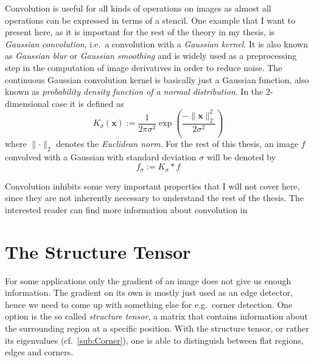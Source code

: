 Convolution is useful for all kinds of operations on images as almost all operations can be
expressed in terms of a stencil.\cite{ipcv}
One example that I want to present here, as it is important for the rest of the theory in my
thesis, is \textit{Gaussian convolution}, i.e.\ a convolution with a
\textit{Gaussian kernel}. It is also known as \textit{Gaussian blur} or \textit{Gaussian
smoothing} and is widely used as a preprocessing step in the computation of image derivatives in
order to reduce noise.
The continuous Gaussian convolution kernel is basically just a Gaussian function, also known as
\textit{probability density function of a normal distribution}. In the 2-dimensional case it is defined as
\begin{equation}
    K_\sigma (\boldsymbol x) := \frac{1}{2\pi\sigma^2}\exp\left(\frac{-\lVert\boldsymbol
            x\rVert_2^2}{2\sigma^2}\right)
\end{equation}
where $\lVert \cdot \rVert_2$ denotes the \textit{Euclidean norm}.
For the rest of this thesis, an image $f$ convolved with a Gaussian with standard deviation $\sigma$
will be denoted by \[f_\sigma := K_\sigma * f\]

Convolution inhibits some very important properties that I will not cover here, since they are not
inherently necessary to understand the rest of the thesis. The interested reader can find more
information about convolution in \cite{dspguide}\cite{ipcv}

\section{The Structure Tensor}\label{sec:Structure}
For some applications only the gradient of an image does not give us enough information. The
gradient on its own is mostly just used as an edge detector, hence we need to come up with
something else for e.g.\ corner detection\cite{ipcv}. One option is the so called \textit{structure tensor}, a
matrix that contains information about the surrounding region at a specific position. With the
structure tensor, or rather its eigenvalues (cf.~\ref{sub:Corner}), one is able to
distinguish between flat regions, edges and corners.

